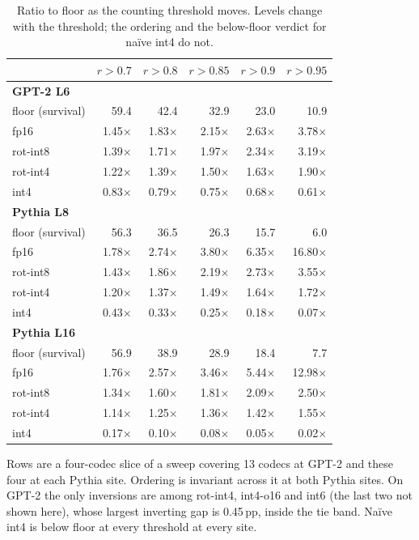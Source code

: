 \begin{table}[htbp]
\caption{Ratio to floor as the counting threshold moves. Levels change with the threshold; the ordering and the below-floor verdict for na\"ive int4 do not.}
\label{tab:threshold}
\centering\small
\begin{tabular}{lrrrrr}
\toprule
 & $r>0.7$ & $r>0.8$ & $r>0.85$ & $r>0.9$ & $r>0.95$ \\
\midrule
\textbf{GPT-2 L6} &  &  &  &  &  \\
floor (survival) & 59.4 & 42.4 & 32.9 & 23.0 & 10.9 \\
fp16 & 1.45$\times$ & 1.83$\times$ & 2.15$\times$ & 2.63$\times$ & 3.78$\times$ \\
rot-int8 & 1.39$\times$ & 1.71$\times$ & 1.97$\times$ & 2.34$\times$ & 3.19$\times$ \\
rot-int4 & 1.22$\times$ & 1.39$\times$ & 1.50$\times$ & 1.63$\times$ & 1.90$\times$ \\
int4 & 0.83$\times$ & 0.79$\times$ & 0.75$\times$ & 0.68$\times$ & 0.61$\times$ \\
\midrule
\textbf{Pythia L8} &  &  &  &  &  \\
floor (survival) & 56.3 & 36.5 & 26.3 & 15.7 & 6.0 \\
fp16 & 1.78$\times$ & 2.74$\times$ & 3.80$\times$ & 6.35$\times$ & 16.80$\times$ \\
rot-int8 & 1.43$\times$ & 1.86$\times$ & 2.19$\times$ & 2.73$\times$ & 3.55$\times$ \\
rot-int4 & 1.20$\times$ & 1.37$\times$ & 1.49$\times$ & 1.64$\times$ & 1.72$\times$ \\
int4 & 0.43$\times$ & 0.33$\times$ & 0.25$\times$ & 0.18$\times$ & 0.07$\times$ \\
\midrule
\textbf{Pythia L16} &  &  &  &  &  \\
floor (survival) & 56.9 & 38.9 & 28.9 & 18.4 & 7.7 \\
fp16 & 1.76$\times$ & 2.57$\times$ & 3.46$\times$ & 5.44$\times$ & 12.98$\times$ \\
rot-int8 & 1.34$\times$ & 1.60$\times$ & 1.81$\times$ & 2.09$\times$ & 2.50$\times$ \\
rot-int4 & 1.14$\times$ & 1.25$\times$ & 1.36$\times$ & 1.42$\times$ & 1.55$\times$ \\
int4 & 0.17$\times$ & 0.10$\times$ & 0.08$\times$ & 0.05$\times$ & 0.02$\times$ \\
\bottomrule
\end{tabular}
\par\smallskip\footnotesize Rows are a four-codec slice of a sweep covering 13 codecs at GPT-2 and these four at each Pythia site. Ordering is invariant across it at both Pythia sites. On GPT-2 the only inversions are among rot-int4, int4-o16 and int6 (the last two not shown here), whose largest inverting gap is 0.45\,pp, inside the tie band. Na\"ive int4 is below floor at every threshold at every site.
\end{table}

